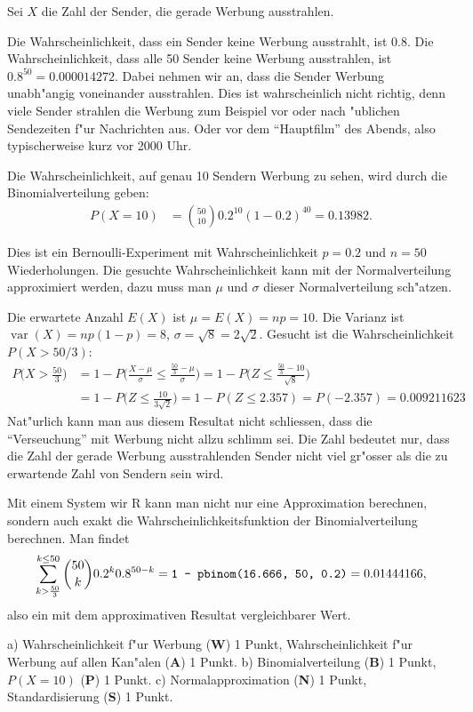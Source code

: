 \begin{loesung}
Sei $X$ die Zahl der Sender, die gerade Werbung ausstrahlen.
\begin{teilaufgaben}
\item
Die Wahrscheinlichkeit, dass ein Sender keine Werbung ausstrahlt, ist
$0.8$. Die Wahrscheinlichkeit, dass alle 50 Sender keine Werbung
ausstrahlen, ist $0.8^{50}=0.000014272$.
Dabei nehmen wir an, dass die Sender Werbung unabh"angig voneinander 
ausstrahlen. Dies ist wahrscheinlich nicht richtig, denn viele Sender
strahlen die Werbung zum Beispiel vor oder nach "ublichen Sendezeiten
f"ur Nachrichten aus. Oder vor dem ``Hauptfilm'' des Abends, also
typischerweise kurz vor 2000 Uhr.
\item
Die Wahrscheinlichkeit, auf genau 10 Sendern Werbung zu sehen, wird durch
die Binomialverteilung geben: 
\begin{align*}
P(X=10)&=\binom{50}{10}0.2^{10}(1-0.2)^{40}=0.13982.
\end{align*}
\item
Dies ist ein Bernoulli-Experiment mit Wahrscheinlichkeit $p=0.2$
und $n=50$ Wiederholungen. Die gesuchte Wahrscheinlichkeit kann mit
der Normalverteilung approximiert werden, dazu muss man $\mu$ und
$\sigma$ dieser Normalverteilung sch"atzen.

Die erwartete Anzahl $E(X)$ ist $\mu=E(X)=np=10$. Die Varianz ist
$\operatorname{var}(X)=np(1-p)=8$, $\sigma=\sqrt{8}=2\sqrt{2}$.
Gesucht ist die Wahrscheinlichkeit $P(X>50/3)$:
\begin{align*}
P\biggl(
X>\frac{50}3
\biggr)
&=
1-P\biggl(
\frac{X-\mu}{\sigma}\le \frac{\frac{50}3-\mu}{\sigma}
\biggr)
=
1-P\biggl(
Z\le \frac{\frac{50}3-10}{\sqrt{8}}
\biggr)
\\
&=
1-P\biggl(
Z\le \frac{10}{3\sqrt{2}}
\biggr)
=
1-P(Z\le 2.357) = P(-2.357) = 0.009211623
\end{align*}
Nat"urlich kann man aus diesem Resultat nicht schliessen, dass 
die ``Verseuchung'' mit Werbung nicht allzu schlimm sei.
Die Zahl bedeutet nur, dass die Zahl der gerade Werbung ausstrahlenden
Sender nicht viel gr"osser als die zu erwartende Zahl von Sendern
sein wird.

Mit einem System wir R kann man nicht nur eine Approximation berechnen,
sondern auch exakt die Wahrscheinlichkeitsfunktion der Binomialverteilung
berechnen. Man findet
\[
\sum_{k>\frac{50}3}^{k\le 50}\binom{50}{k}0.2^k0.8^{50-k}
=
\text{\tt 1 - pbinom(16.666, 50, 0.2)}
=0.01444166,
\]
also ein mit dem approximativen Resultat vergleichbarer Wert.
\qedhere
\end{teilaufgaben}
\end{loesung}

\begin{bewertung}
a) Wahrscheinlichkeit f"ur Werbung ({\bf W}) 1 Punkt,
Wahrscheinlichkeit f"ur Werbung auf allen Kan"alen ({\bf A}) 1 Punkt.
b) Binomialverteilung ({\bf B}) 1 Punkt, $P(X=10)$ ({\bf P}) 1 Punkt.
c) Normalapproximation ({\bf N}) 1 Punkt, Standardisierung ({\bf S}) 1 Punkt.
\end{bewertung}
